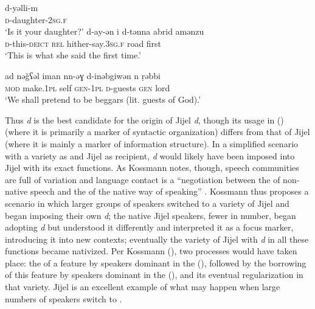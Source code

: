 \documentclass[output=paper]{langsci/langscibook}
\begin{document}
\begin{exe}
\ex\label{Berber pred}
\gll d-yǝlli-m\\
     \textsc{d}-daughter-\textsc{2sg.f}\\
\glt ‘Is it your daughter?’
\ex\label{Berber cleft}
\gll d-ay-ǝn  i  d-tǝnna  abrid  amǝnzu\\
     \textsc{d}-this-\textsc{deict}  \textsc{rel}  hither-say.\textsc{3sg.f}  road  first\\
\glt ‘This is what she said the first time.’
\ex\label{Berber secondary}

\gll ad  nǝǧʕǝl  iman  nn-ǝɣ  d-inǝbgiwǝn  n  ṛǝbbi\\
     \textsc{mod} make.\textsc{1pl} self \textsc{gen-1pl}  \textsc{d}-guests \textsc{gen}  lord\\
\glt ‘We shall pretend to be beggars (lit. guests of God).’
\end{exe}

Thus  \textit{d} is the best candidate for the origin of Jijel  \textit{d}, though its usage in ()  (where it is primarily a marker of syntactic organization) differs from that of Jijel  (where it is mainly a marker of information structure). In a simplified scenario with a  variety as  and Jijel  as recipient, \textit{d} would likely have been imposed into Jijel  with its exact  functions. As Kossmann notes, though, speech communities are full of variation and language contact is a “negotiation between the  of non-native speech and the  of the native way of speaking” \citep[138]{Kossmann2014}. Kossmann thus proposes a scenario in which larger groups of  speakers switched to a variety of Jijel  and began imposing their own \textit{d}; the native Jijel  speakers, fewer in number, began adopting \textit{d} but understood it differently and interpreted it as a focus marker, introducing it into new contexts; eventually the variety of Jijel  with \textit{d} in all these functions became nativized. Per Kossmann (\citeyear[138]{Kossmann2014}), two processes would have taken place: the  of a  feature by speakers dominant in the  (), followed by the borrowing of this feature by speakers dominant in the  (), and its eventual regularization in that variety. Jijel  is an excellent example of what may happen when large numbers of  speakers switch to .
\end{document}
